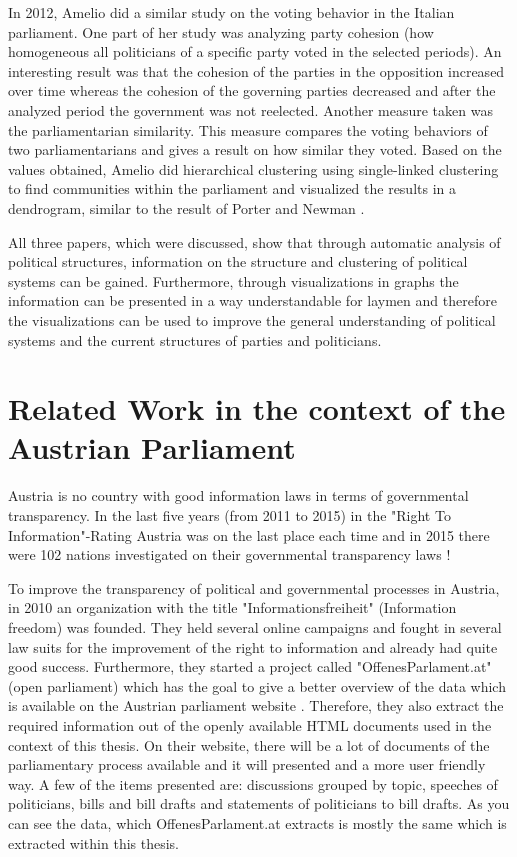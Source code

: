 In 2012, Amelio \cite{Amelio_2012} did a similar study on the voting behavior in the Italian parliament. One part of her study was analyzing party cohesion (how homogeneous all politicians of a specific party voted in the selected periods). An interesting result was that the cohesion of the parties in the opposition increased over time whereas the cohesion of the governing parties decreased and after the analyzed period the government was not reelected. Another measure taken was the parliamentarian similarity. This measure compares the voting behaviors of two parliamentarians and gives a result on how similar they voted. Based on the values obtained, Amelio did hierarchical clustering using single-linked clustering to find communities within the parliament and visualized the results in a dendrogram, similar to the result of Porter and Newman \cite{Porter_2005}. 

All three papers, which were discussed, show that through automatic analysis of political structures, information on the structure and clustering of political systems can be gained. Furthermore, through visualizations in graphs the information can be presented in a way understandable for laymen and therefore the visualizations can be used to improve the general understanding of political systems and the current structures of parties and politicians.

\section{Related Work in the context of the Austrian Parliament}
Austria is no country with good information laws in terms of governmental transparency. In the last five years (from 2011 to 2015) in the "Right To Information"-Rating Austria was on the last place each time and in 2015 there were 102 nations investigated on their governmental transparency laws \cite{Informationsfreiheit_2015}!

To improve the transparency of political and governmental processes in Austria, in 2010 an organization with the title "Informationsfreiheit" (Information freedom) \cite{Informationsfreiheit_2015} was founded. They held several online campaigns and fought in several law suits for the improvement of the right to information and already had quite good success. Furthermore, they started a project called "OffenesParlament.at" (open parliament) \cite{OffenesParlament_2015} which has the goal to give a better overview of the data which is available on the Austrian parliament website \cite{AustrianParliament_2015}. Therefore, they also extract the required information out of the openly available HTML documents used in the context of this thesis. On their website, there will be a lot of documents of the parliamentary process available and it will presented and a more user friendly way. A few of the items presented are: discussions grouped by topic, speeches of politicians, bills and bill drafts and statements of politicians to bill drafts. As you can see the data, which OffenesParlament.at extracts is mostly the same which is extracted within this thesis.

